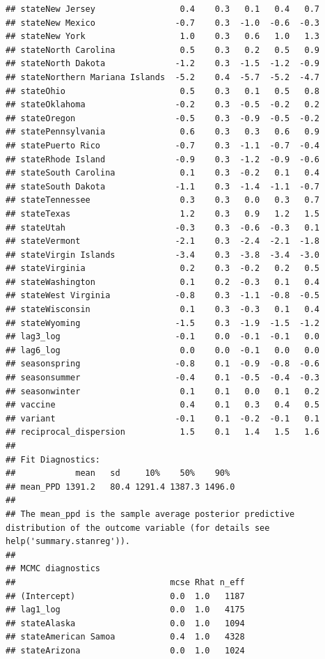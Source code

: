 \documentclass[
]{book}
\begin{document}
\begin{verbatim}
## stateNew Jersey                 0.4    0.3   0.1   0.4   0.7
## stateNew Mexico                -0.7    0.3  -1.0  -0.6  -0.3
## stateNew York                   1.0    0.3   0.6   1.0   1.3
## stateNorth Carolina             0.5    0.3   0.2   0.5   0.9
## stateNorth Dakota              -1.2    0.3  -1.5  -1.2  -0.9
## stateNorthern Mariana Islands  -5.2    0.4  -5.7  -5.2  -4.7
## stateOhio                       0.5    0.3   0.1   0.5   0.8
## stateOklahoma                  -0.2    0.3  -0.5  -0.2   0.2
## stateOregon                    -0.5    0.3  -0.9  -0.5  -0.2
## statePennsylvania               0.6    0.3   0.3   0.6   0.9
## statePuerto Rico               -0.7    0.3  -1.1  -0.7  -0.4
## stateRhode Island              -0.9    0.3  -1.2  -0.9  -0.6
## stateSouth Carolina             0.1    0.3  -0.2   0.1   0.4
## stateSouth Dakota              -1.1    0.3  -1.4  -1.1  -0.7
## stateTennessee                  0.3    0.3   0.0   0.3   0.7
## stateTexas                      1.2    0.3   0.9   1.2   1.5
## stateUtah                      -0.3    0.3  -0.6  -0.3   0.1
## stateVermont                   -2.1    0.3  -2.4  -2.1  -1.8
## stateVirgin Islands            -3.4    0.3  -3.8  -3.4  -3.0
## stateVirginia                   0.2    0.3  -0.2   0.2   0.5
## stateWashington                 0.1    0.2  -0.3   0.1   0.4
## stateWest Virginia             -0.8    0.3  -1.1  -0.8  -0.5
## stateWisconsin                  0.1    0.3  -0.3   0.1   0.4
## stateWyoming                   -1.5    0.3  -1.9  -1.5  -1.2
## lag3_log                       -0.1    0.0  -0.1  -0.1   0.0
## lag6_log                        0.0    0.0  -0.1   0.0   0.0
## seasonspring                   -0.8    0.1  -0.9  -0.8  -0.6
## seasonsummer                   -0.4    0.1  -0.5  -0.4  -0.3
## seasonwinter                    0.1    0.1   0.0   0.1   0.2
## vaccine                         0.4    0.1   0.3   0.4   0.5
## variant                        -0.1    0.1  -0.2  -0.1   0.1
## reciprocal_dispersion           1.5    0.1   1.4   1.5   1.6
## 
## Fit Diagnostics:
##            mean   sd     10%    50%    90% 
## mean_PPD 1391.2   80.4 1291.4 1387.3 1496.0
## 
## The mean_ppd is the sample average posterior predictive distribution of the outcome variable (for details see help('summary.stanreg')).
## 
## MCMC diagnostics
##                               mcse Rhat n_eff
## (Intercept)                   0.0  1.0   1187
## lag1_log                      0.0  1.0   4175
## stateAlaska                   0.0  1.0   1094
## stateAmerican Samoa           0.4  1.0   4328
## stateArizona                  0.0  1.0   1024

\end{verbatim}
\end{document}
